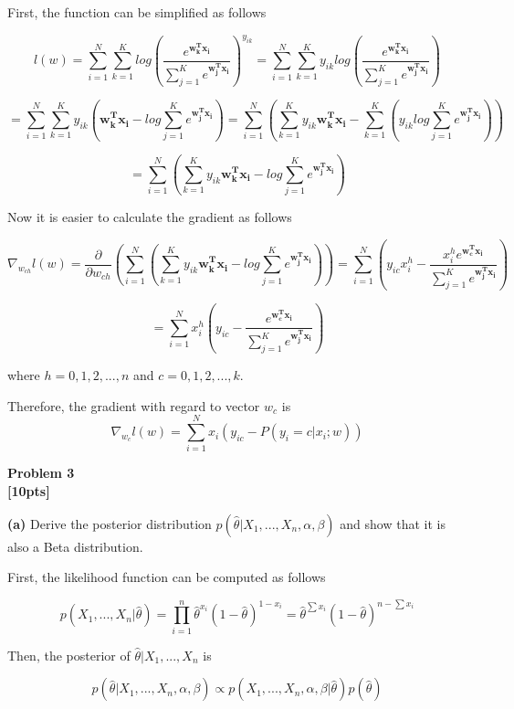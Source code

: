 \documentclass[12pt,article]{article}
\newenvironment{problem}[2][Problem]
    { \begin{mdframed}[backgroundcolor=gray!20] \textbf{#1 #2} \\}
    {  \end{mdframed}}
\begin{document}
First, the function can be simplified as follows

$$
l(w) = \sum_{i=1}^{N} \sum_{k=1}^{K} log(\frac{e^{\mathbf{w_k^T x_i}}}{\sum_{j=1}^{K} e^{\mathbf{w_j^T x_i}}}) ^ {y_{ik}}
= \sum_{i=1}^{N} \sum_{k=1}^{K} y_{ik} log(\frac{e^{\mathbf{w_k^T x_i}}}{\sum_{j=1}^{K} e^{\mathbf{w_j^T x_i}}})
$$

$$
= \sum_{i=1}^{N} \sum_{k=1}^{K} y_{ik} (\mathbf{w_k^T x_i} - log \sum_{j=1}^{K} e^{\mathbf{w_j^T x_i}})
= \sum_{i=1}^{N} (\sum_{k=1}^{K} y_{ik} \mathbf{w_k^T x_i} - \sum_{k=1}^{K}( y_{ik} log \sum_{j=1}^{K} e^{\mathbf{w_j^T x_i}}))
$$

$$
= \sum_{i=1}^{N} (\sum_{k=1}^{K} y_{ik} \mathbf{w_k^T x_i} - log \sum_{j=1}^{K} e^{\mathbf{w_j^T x_i}})
$$

Now it is easier to calculate the gradient as follows

$$
\nabla_{w_{ch}} l(w) = \frac{\partial}{\partial w_{ch}} (\sum_{i=1}^{N} (\sum_{k=1}^{K} y_{ik} \mathbf{w_k^T x_i} - log \sum_{j=1}^{K} e^{\mathbf{w_j^T x_i}}))
= \sum_{i=1}^{N} (y_{ic} x_i^h - \frac{x_i^h e^{\mathbf{w_c^T x_i}}}{\sum_{j=1}^{K} e^{\mathbf{w_j^T x_i}}})
$$

$$
= \sum_{i=1}^{N} x_i^h (y_{ic} - \frac{e^{\mathbf{w_c^T x_i}}}{\sum_{j=1}^{K} e^{\mathbf{w_j^T x_i}}})
$$

where $h = 0,1,2,...,n$ and $c = 0,1,2,...,k$.

Therefore, the gradient with regard to vector $w_c$ is
$$
\nabla_{w_c} l(w) = \sum_{i=1}^{N} x_i (y_{ic} - P(y_i = c|x_i;w))
$$

\newpage
\begin{problem}{3}
\textbf{[10pts]}
\end{problem}

\textbf{(a)} Derive the posterior distribution $p(\hat{\theta} | X_1,...,X_n,\alpha,\beta)$
and show that it is also a Beta distribution.

First, the likelihood function can be computed as follows

$$
p(X_1,...,X_n | \hat{\theta}) = \prod_{i=1}^{n} \hat{\theta}^{x_i} (1 - \hat{\theta})^{1 - x_i} 
= \hat{\theta}^{\sum x_i} (1 - \hat{\theta})^{n - \sum x_i}
$$

Then, the posterior of $\hat{\theta} | X_1,...,X_n$ is 

$$
p(\hat{\theta} | X_1,...,X_n,\alpha,\beta) \propto p(X_1,...,X_n,\alpha,\beta| \hat{\theta}) p(\hat{\theta})
$$
\end{document}
